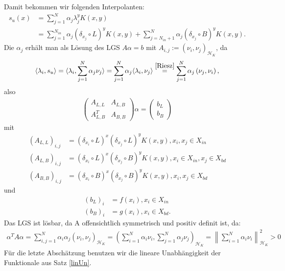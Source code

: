 Damit bekommen wir folgenden Interpolanten:
\begin{align*}
s_u(x) &= \sum_{j=1}^N \alpha_j \lambda_j^y K(x,y)\\
&= \sum_{j=1}^{N_{in}} \alpha_j (\delta_{x_j} \circ L)^y K(x,y) + \sum_{j=N_{in}+1}^{N} \alpha_j (\delta_{x_j} \circ B)^y K(x,y).
\end{align*}
Die $\alpha_j$ erhält man als Lösung des \ac{LGS} $A \alpha = b$ mit $A_{i,j} := (\nu_i,\nu_j)_{\mathcal{H}_K}$, da
\begin{align*}
\langle \lambda_i, s_u\rangle = \langle \lambda_i, \sum_{j=1}^N \alpha_j \nu_j \rangle = \sum_{j=1}^N \alpha_j \langle \lambda_i,\nu_j\rangle \overset{\ref{Riesz}}{=} \sum_{j=1}^N \alpha_j \left(\nu_j, \nu_i\right),
\end{align*}
also
\begin{align*}
\begin{pmatrix}
A_{L,L} & A_{L,B} \\ 
A_{L,B}^T & A_{B,B}
\end{pmatrix} 
\alpha =
\begin{pmatrix}
b_L \\ 
b_B
\end{pmatrix} 
\end{align*}
mit
\begin{align*}
(A_{L,L})_{i,j} &= (\delta_{x_i} \circ L)^x(\delta_{x_j} \circ L)^y K(x,y),x_i, x_j \in X_{in}\\
(A_{L,B})_{i,j} &= (\delta_{x_i} \circ L)^x(\delta_{x_j} \circ B)^y K(x,y),x_i \in X_{in}, x_j \in X_{bd} \\
(A_{B,B})_{i,j} &= (\delta_{x_i} \circ B)^x(\delta_{x_j} \circ B)^y K(x,y), x_i, x_j \in X_{bd}
\end{align*}
und
\begin{align*}
(b_L)_i &= f(x_i), x_i \in X_{in}\\
(b_B)_i &= g(x_i), x_i \in X_{bd}.
\end{align*}
Das \ac{LGS} ist lösbar, da A offensichtlich symmetrisch und positiv definit ist, da:
\begin{align*}
\alpha^T A \alpha = \sum_{i,j = 1}^N \alpha_i \alpha_j (\nu_i, \nu_j)_{\mathcal{H}_K} = \left(\sum_{i=1}^N \alpha_i \nu_i, \sum_{j=1}^N \alpha_j \nu_j \right)_{\mathcal{H}_K} = \left\| \sum_{i=1}^N \alpha_i \nu_i \right\|_{\mathcal{H}_K}^2 > 0
\end{align*}
Für die letzte Abschätzung benutzen wir die lineare Unabhängigkeit der Funktionale aus Satz \ref{linUn}.
